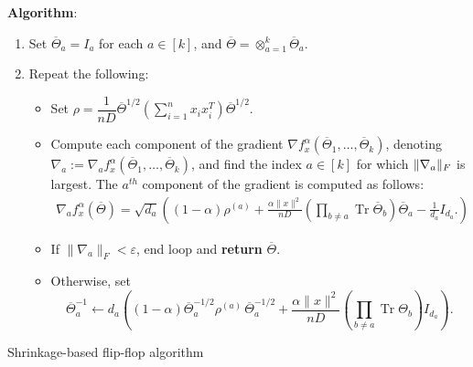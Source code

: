 \documentclass[aos]{imsart}
\theoremstyle{definition}
\numberwithin{equation}{section}
\DeclareMathOperator{\tr}{Tr}
\DeclarePairedDelimiter{\norm}{\lVert}{\rVert}
\newcommand{\otheta}{\overline{\Theta}}
\newcommand{\eps}{\varepsilon}
\newcommand{\samp}{x}
\begin{document}
\begin{Algorithm}
\begin{description}
\item[\hspace{.2cm}\textbf{Algorithm}:]
\end{description}
\begin{enumerate}
\item\label{it:flip-flop step 1 reg} Set $\otheta_a = I_a$ for each $a \in [k]$, and $\otheta = \otimes_{a=1}^k \otheta_a$.
\item\label{it:flip-flop step 2 reg} Repeat the following:
\begin{itemize}
\item Set
$\rho = \dfrac{1}{nD} \otheta^{1/2} \left( \sum_{i=1}^n x_ix_i^T \right) \otheta^{1/2}.$
\item Compute each component of the gradient $\nabla f^\alpha_{\samp}(\otheta_1, \ldots, \otheta_k)$, denoting $\nabla_a := \nabla_a f^\alpha_{\samp}(\otheta_1, \ldots, \otheta_k)$, and find the index $a \in [k]$ for which $\norm{\nabla_a}_F$ is largest.
The $a^{th}$ component of the gradient is computed as follows:
\begin{align*}
  \nabla_a f^\alpha_\samp(\otheta) =
  \sqrt{d_a} \left((1 - \alpha) \rho^{(a)} +
  \frac{\alpha \|x\|^2}{nD}  (\prod_{b \neq a} \tr \otheta_b ) \otheta_a - \frac{1}{d_a} I_{d_a}.\right)
\end{align*}
\item If $\|\nabla_a \|_F < \eps$, end loop and \textbf{return} $\overline{\Theta}$.
\item Otherwise, set
$$\otheta_a^{-1} \leftarrow  d_a \left((1 - \alpha) \otheta_a^{-1/2} \rho^{(a)} \, \otheta_a^{-1/2} + \frac{\alpha \|x\|^2}{nD} (\prod_{b \neq a} \tr \Theta_b) I_{d_a}  \right).$$

\end{itemize}
\end{enumerate}
\caption{Shrinkage-based flip-flop algorithm}\label{alg:reg-flip-flop}
\end{Algorithm}

\end{document}
